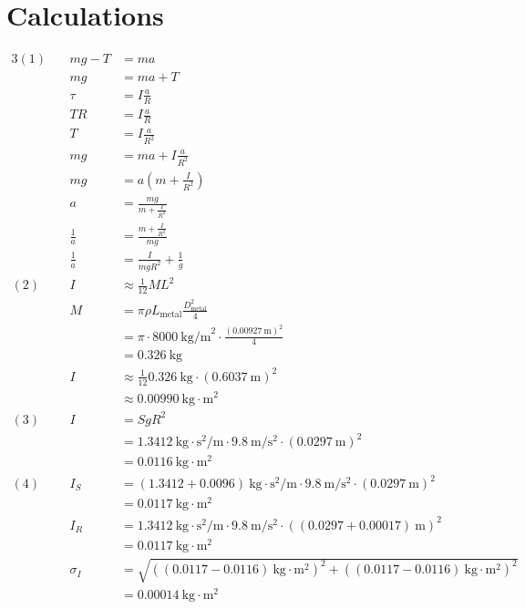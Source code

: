\documentclass[12pt]{article}
\begin{document}
    \section{Calculations}
        \begin{alignat*}{3}
            (1)~
            &&mg-T &= ma\\
            &&mg &= ma + T\\
            &&\tau &= I\frac{a}{R}\\
            &&TR &= I\frac{a}{R}\\
            &&T &= I\frac{a}{R^2}\\
            &&mg&=ma+I\frac{a}{R^2}\\
            &&mg&=a\left(m+\frac{I}{R^2}\right)\\
            &&a&=\frac{mg}{m+\frac{I}{R^2}}\\
            &&\frac{1}{a} &= \frac{m+\frac{I}{R^2}}{mg}\\
            &&\frac{1}{a} &= \frac{I}{mgR^2}+\frac{1}{g}\\
            (2)~
            &&I &\approx\frac{1}{12}ML^2\\
            &&M &= \pi \rho L_{\mathrm{metal}} \frac{D_{\mathrm{metal}}^2}{4}\\
            &&& = \pi \cdot 8000~\mathrm{kg/m}^2 \cdot \frac{(0.00927~\mathrm{m})^2}{4}\\
            &&& = 0.326~\mathrm{kg}\\
            &&I &\approx \frac{1}{12}0.326 ~\mathrm{kg} \cdot (0.6037~\mathrm{m})^2\\
            &&&\approx 0.00990~\mathrm{kg\cdot m}^2\\
            (3)~
            &&I &= SgR^2\\
            &&& = 1.3412~\mathrm{kg\cdot s^2 /m} \cdot 9.8~\mathrm{m/s^2} \cdot (0.0297~\mathrm{m})^2\\
            &&& = 0.0116 ~\mathrm{kg\cdot m^2}\\
            (4)~
            &&I_S &= (1.3412 + 0.0096)~\mathrm{kg\cdot s^2 /m} \cdot 9.8~\mathrm{m/s^2} \cdot (0.0297~\mathrm{m})^2\\
            &&&= 0.0117 ~\mathrm{kg\cdot m^2}\\
            &&I_R &= 1.3412~\mathrm{kg\cdot s^2 /m} \cdot 9.8~\mathrm{m/s^2} \cdot ((0.0297+0.00017)~\mathrm{m})^2\\
            &&&= 0.0117~\mathrm{kg\cdot m^2}\\
            &&\sigma_I &= \sqrt{((0.0117-0.0116)~\mathrm{kg\cdot m^2})^2+((0.0117-0.0116)~\mathrm{kg\cdot m^2})^2}\\
            &&& = 0.00014~\mathrm{kg\cdot m^2}
        \end{alignat*}
\end{document}
